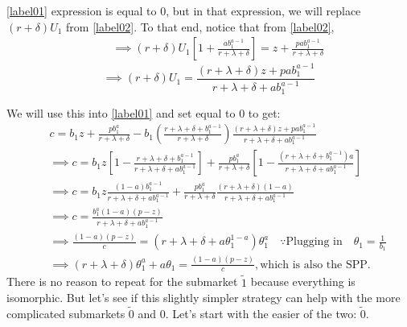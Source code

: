 \documentclass[12pt]{article} %
\theoremstyle{definition}
\begin{document}
\ref{label01} expression is equal to 0, but in that expression, we will replace $(r+\delta)U_1$ from \ref{label02}. To that end, notice that from \ref{label02},
\begin{eqnarray*}
    && \implies (r+\delta) U_1 \left[1 + \frac{ab_1^{a-1}}{r+\lambda+\delta}\right] = z + \frac{p a b_1^{a-1}}{r+\lambda+\delta}
\end{eqnarray*}
\begin{equation}
 \implies (r+\delta) U_1 = \frac{(r+\lambda+\delta)z + p a b_1^{a-1}}{r+\lambda+\delta+a b_1^{a-1}} \label{twostar} \tag{**}    
\end{equation}

We will use this into \ref{label01} and set equal to 0 to get: 
\begin{eqnarray*}
&& c = b_1z + \frac{pb_1^a}{r+\lambda+\delta} - b_1 \left(\frac{r+\lambda+\delta+b_1^{a-1}}{r+\lambda+\delta}\right) \frac{(r+\lambda+\delta)z + p a b_1^{a-1}}{r+\lambda+\delta+a b_1^{a-1}} \\ 
&& \implies c = b_1 z \left[1-\frac{r+\lambda+\delta+b_1^{a-1}}{r+\lambda+\delta+a b_1^{a-1}}\right] + \frac{pb_1^a}{r+\lambda+\delta} \left[1-\frac{(r+\lambda+\delta+b_1^{a-1})a}{r+\lambda+\delta+a b_1^{a-1}}\right] \\
&& \implies c = b_1z \frac{(1-a)b_1^{a-1}}{r+\lambda+\delta+ab_1^{a-1}} +  \frac{pb_1^a}{r+\lambda+\delta} \frac{(r+\lambda+\delta)(1-a)}{r+\lambda+\delta+a b_1^{a-1}} \\
&& \implies c = \frac{b_1^a (1-a)(p-z)}{r+\lambda+\delta+a b_1^{a-1}} \\
&& \implies \frac{(1-a)(p-z)}{c} = (r+\lambda+\delta+a \theta_1^{1-a}) \theta_1^a \quad \because \text{Plugging in} \quad \theta_1 = \frac{1}{b_1} \\
&& \implies (r+\lambda+\delta)\theta_1^a + a \theta_1 = \frac{(1-a)(p-z)}{c}, \text{which is also the SPP.}
\end{eqnarray*}
There is no reason to repeat for the submarket $\tilde{1}$ because everything is isomorphic. But let's see if this slightly simpler strategy can help with the more complicated submarkets $\tilde{0}$ and $0$. Let's start with the easier of the two: $\tilde{0}$.
\end{document}
